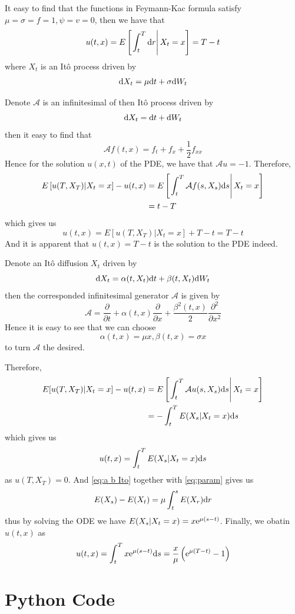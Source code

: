 \documentclass{homework}
\begin{document}
    \problem
    \begin{subproblem}[(\alph*)]
        \item
        It easy to find that the functions in Feymann-Kac formula
        satisfy $\mu=\sigma=f=1,\psi=v=0$, then we have that 
        \[u(t,x)=E\left[\left.\int_t^T\mathrm d r\right|X_t=x\right]
        =T-t\]
        where $X_t$ is an It\^o process driven by
        \[\mathrm d X_t=\mu\mathrm d t+\sigma\mathrm d W_t\]

        \item
        Denote $\mathcal A$ is an infinitesimal of
        then It\^o process driven by
        \[\mathrm d X_t=\mathrm d t+\mathrm d W_t\]
        then it easy to find that
        \[\mathcal Af(t,x)=f_t+f_x+\frac{1}{2}f_{xx}\]
        Hence for the solution $u(x,t)$ of the PDE, we have
        that $\mathcal Au=-1$.
        Therefore,
        \[\begin{aligned}
            E\left[u(T,X_T)|X_t=x\right]
            -u(t,x)&=
            E\left[\left.\int_t^{T}
            \mathcal Af(s,X_{s})\mathrm d s\right|X_t=x\right]\\
            &=t-T
        \end{aligned}\]
        which gives us
        \[u(t,x)=E[u(T,X_T)|X_t=x]+T-t=T-t\]
        And it is apparent that $u(t,x)=T-t$ is the solution to the
        PDE indeed.
    \end{subproblem}

    \problem
    Denote an It\^o diffusion $X_t$ driven by
    \begin{equation}
        \label{eq:a b Ito}
        \mathrm d X_t=\alpha(t,X_t)\mathrm d t+\beta(t,X_t)\mathrm d W_t
    \end{equation}
    then the corresponded infinitesimal generator $\mathcal A$
    is given by
    \[\mathcal A=\frac{\partial}{\partial t}+\alpha(t,x)\frac{\partial}{\partial x}
    +\frac{\beta^2(t,x)}{2}\frac{\partial^2}{\partial x^2}\]
    Hence it is easy to see that we can choose
    \begin{equation}
        \label{eq:param}
        \alpha(t,x)=\mu x,\beta(t,x)=\sigma x
    \end{equation}
    to turn $\mathcal A$ the desired.

    Therefore,
    \[\begin{aligned}
        E[u(T,X_T)|X_t=x]-u(t,x)
        &=E\left[\left.\int_t^T\mathcal Au(s,X_s)\mathrm d s\right|
        X_t=x\right]\\
        &=-\int_t^TE(X_s|X_t=x)\mathrm d s
    \end{aligned}\]
    which gives us
    \[u(t,x)=\int_t^TE(X_s|X_t=x)\mathrm d s\]
    as $u(T,X_T)=0$.
    And \cref{eq:a b Ito} together with \cref{eq:param} gives us
    \[E(X_s)-E(X_t)=\mu\int_t^sE(X_r)\mathrm d r\]
    thus by solving the ODE we have $E(X_s|X_t=x)=x\mathrm e^{\mu(s-t)}$.
    Finally, we obatin $u(t,x)$ as
    \[u(t,x)=\int_t^Tx\mathrm e^{\mu(s-t)}\mathrm d s
    =\frac{x}{\mu}\left(\mathrm e^{\mu(T-t)}-1\right)\]

    \appendix
    \section{Python Code}
    
\end{document}
